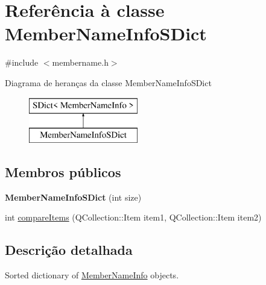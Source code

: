 \hypertarget{class_member_name_info_s_dict}{\section{Referência à classe Member\-Name\-Info\-S\-Dict}
\label{class_member_name_info_s_dict}
}


{\ttfamily \#include $<$membername.\-h$>$}

Diagrama de heranças da classe Member\-Name\-Info\-S\-Dict\begin{figure}[H]
\begin{center}
\leavevmode
\includegraphics[height=2.000000cm]{class_member_name_info_s_dict}
\end{center}
\end{figure}
\subsection*{Membros públicos}
\begin{DoxyCompactItemize}
\item 
\hypertarget{class_member_name_info_s_dict_ac6e2ba8a6b120cf67587e62361c83d47}{{\bfseries Member\-Name\-Info\-S\-Dict} (int size)}\label{class_member_name_info_s_dict_ac6e2ba8a6b120cf67587e62361c83d47}

\item 
int \hyperlink{class_member_name_info_s_dict_a219450accf048597ffc7113ecde4c402}{compare\-Items} (Q\-Collection\-::\-Item item1, Q\-Collection\-::\-Item item2)
\end{DoxyCompactItemize}


\subsection{Descrição detalhada}
Sorted dictionary of \hyperlink{class_member_name_info}{Member\-Name\-Info} objects. 

